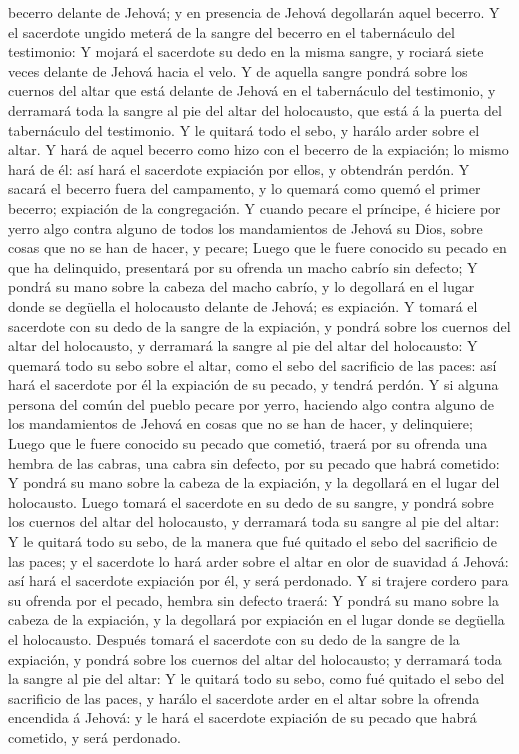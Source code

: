 becerro delante de Jehová; y en presencia de Jehová degollarán aquel
becerro.  Y el sacerdote ungido meterá de la sangre del
becerro en el tabernáculo del testimonio:  Y mojará el
sacerdote su dedo en la misma sangre, y rociará siete veces delante de
Jehová hacia el velo.  Y de aquella sangre pondrá sobre
los cuernos del altar que está delante de Jehová en el tabernáculo del
testimonio, y derramará toda la sangre al pie del altar del holocausto,
que está á la puerta del tabernáculo del testimonio.  Y
le quitará todo el sebo, y harálo arder sobre el altar. 
Y hará de aquel becerro como hizo con el becerro de la expiación; lo
mismo hará de él: así hará el sacerdote expiación por ellos, y obtendrán
perdón.  Y sacará el becerro fuera del campamento, y lo
quemará como quemó el primer becerro; expiación de la congregación.
 Y cuando pecare el príncipe, é hiciere por yerro algo
contra alguno de todos los mandamientos de Jehová su Dios, sobre cosas
que no se han de hacer, y pecare;  Luego que le fuere
conocido su pecado en que ha delinquido, presentará por su ofrenda un
macho cabrío sin defecto;  Y pondrá su mano sobre la
cabeza del macho cabrío, y lo degollará en el lugar donde se degüella el
holocausto delante de Jehová; es expiación.  Y tomará el
sacerdote con su dedo de la sangre de la expiación, y pondrá sobre los
cuernos del altar del holocausto, y derramará la sangre al pie del altar
del holocausto:  Y quemará todo su sebo sobre el altar,
como el sebo del sacrificio de las paces: así hará el sacerdote por él
la expiación de su pecado, y tendrá perdón.  Y si alguna
persona del común del pueblo pecare por yerro, haciendo algo contra
alguno de los mandamientos de Jehová en cosas que no se han de hacer, y
delinquiere;  Luego que le fuere conocido su pecado que
cometió, traerá por su ofrenda una hembra de las cabras, una cabra sin
defecto, por su pecado que habrá cometido:  Y pondrá su
mano sobre la cabeza de la expiación, y la degollará en el lugar del
holocausto.  Luego tomará el sacerdote en su dedo de su
sangre, y pondrá sobre los cuernos del altar del holocausto, y derramará
toda su sangre al pie del altar:  Y le quitará todo su
sebo, de la manera que fué quitado el sebo del sacrificio de las paces;
y el sacerdote lo hará arder sobre el altar en olor de suavidad á
Jehová: así hará el sacerdote expiación por él, y será perdonado.
 Y si trajere cordero para su ofrenda por el pecado,
hembra sin defecto traerá:  Y pondrá su mano sobre la
cabeza de la expiación, y la degollará por expiación en el lugar donde
se degüella el holocausto.  Después tomará el sacerdote
con su dedo de la sangre de la expiación, y pondrá sobre los cuernos del
altar del holocausto; y derramará toda la sangre al pie del altar:
 Y le quitará todo su sebo, como fué quitado el sebo del
sacrificio de las paces, y harálo el sacerdote arder en el altar sobre
la ofrenda encendida á Jehová: y le hará el sacerdote expiación de su
pecado que habrá cometido, y será perdonado.

